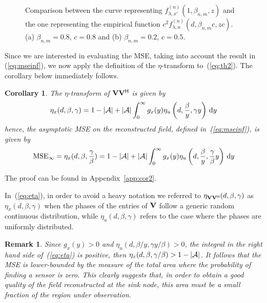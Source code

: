 \documentclass[11pt, draftcls, onecolumn, a4paper]{IEEEtran}
\newtheorem{corollary}{Corollary}[section]
\newtheorem{remark}{Remark}[section]
\newcommand{\Vm}{{\bf V}}
\def\MSEinf{{\rm MSE}_{\infty}}
\newcommand{\Ac}{{\cal A}}
\def\Herm{\mathsf{^H}}
\begin{document}
\begin{figure}
\centering 
{}
\hspace{0.05\columnwidth}
\caption{Comparison between the curve representing 
$f^{(n)}_{\lambda,x'}(1,\beta_{n,m},z)$ and the one representing
the empirical function $c^2f^{(n)}_{\lambda,u}(d,\beta_{n,m} c,zc)$.
(a) $\beta_{n,m}=0.8$, $c=0.8$ and (b) $\beta_{n,m}=0.2$, $c=0.5$.}
\end{figure}


Since we are  interested in evaluating the MSE, taking into account 
the result in (\ref{eq:mseinf}), we now apply the definition of the 
$\eta$-transform to~(\ref{eq:th2}).
The corollary below immediately follows.
\begin{corollary}
\label{cor2}
The $\eta$-transform of $\Vm\Vm\Herm$ is given by
 \begin{equation} 
\eta_{x}(d,\beta,\gamma) = 1-|\Ac|+|\Ac|\int_0^{\infty}g_x(y) \eta_{u}\left(d,\frac{\beta}{y},\gamma y\right)\dd y 
\label{eq:eta}
\end{equation}
hence, the asymptotic MSE on the reconstructed field, 
defined in~(\ref{eq:mseinf}), is given by 
 \begin{equation} 
\MSEinf=\eta_{x}(d,\beta,\frac{\gamma}{\beta}) = 1-|\Ac|+|\Ac|
\int_0^{\infty}g_x(y) \eta_{u}\left(d,\frac{\beta}{y},\frac{\gamma}{\beta} y\right)\dd y 
\label{eq:MSEinf-eta}
\end{equation}
\end{corollary}
\begin{IEEEproof}
The proof can be found in Appendix~\ref{app:cor2}.
\end{IEEEproof}
In~(\ref{eq:eta}), in order to avoid a heavy notation we referred to
$\eta_{\Vm\Vm\Herm}(d,\beta,\gamma)$ as $\eta_{x}(d,\beta,\gamma)$
when the phases of the entries of $\Vm$ follow a generic random
continuous distribution, while $\eta_{u}(d,\beta,\gamma)$ refers to
the case where the phases are
uniformly distributed.

\begin{remark}
Since $g_x(y)>0$ and $\eta_u(d,\beta/y,\gamma y/\beta)>0$, the integral in
the right hand side of~(\ref{eq:eta}) is positive, then
$\eta_x(d,\beta,\gamma/\beta)> 1-|\Ac|$.  It follows that the MSE is
lower-bounded by the measure of the total area where the probability
of finding a sensor is zero. This clearly suggests
that, in order to obtain a
good quality of the field reconstructed at the sink node, 
this area must be a small fraction of the region under observation.
\end{remark}
\end{document}
